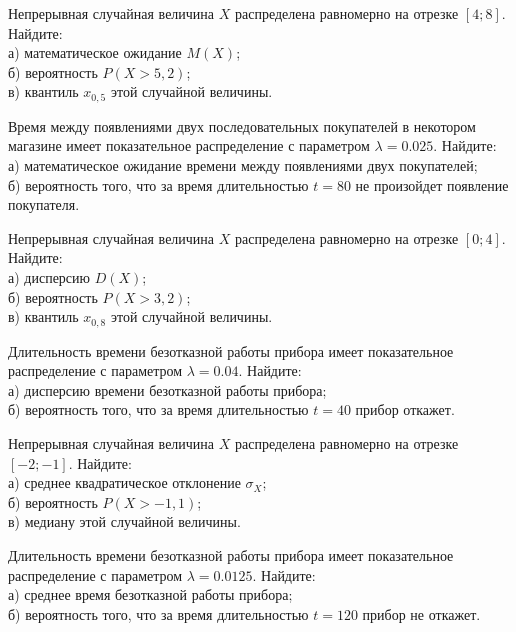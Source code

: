 \vfill

\newpage\setcounter{zad}{0}

\z Непрерывная случайная величина $X$ распределена равномерно на отрезке $[4; 8]$. Найдите: \\ \quad а) математическое ожидание $M(X)$; \\ \quad б) вероятность $P(X>5{,}2)$; \\ \quad в) квантиль $x_{0{,}5}$ этой случайной величины.


\vfill

\z Время между появлениями двух последовательных покупателей в некотором магазине имеет показательное распределение с параметром $\lambda = 0.025$. Найдите: \\ \quad а) математическое ожидание времени между появлениями двух покупателей; \\ \quad б) вероятность того, что за время длительностью $t = 80$ не произойдет появление покупателя.
 

\vfill

\newpage\setcounter{zad}{0}

\z Непрерывная случайная величина $X$ распределена равномерно на отрезке $[0; 4]$. Найдите: \\ \quad а) дисперсию $D(X)$; \\ \quad б) вероятность $P(X>3{,}2)$; \\ \quad в) квантиль $x_{0{,}8}$ этой случайной величины.


\vfill

\z Длительность времени безотказной работы прибора имеет показательное распределение с параметром $\lambda = 0.04$. Найдите: \\ \quad а) дисперсию времени безотказной работы прибора; \\ \quad б) вероятность того, что за время длительностью $t = 40$ прибор  откажет.
 

\vfill

\newpage\setcounter{zad}{0}

\z Непрерывная случайная величина $X$ распределена равномерно на отрезке $[-2; -1]$. Найдите: \\ \quad а) среднее квадратическое отклонение $\sigma_X$; \\ \quad б) вероятность $P(X>-1{,}1)$; \\ \quad в) медиану этой случайной величины.


\vfill

\z Длительность времени безотказной работы прибора имеет показательное распределение с параметром $\lambda = 0.0125$. Найдите: \\ \quad а) среднее время безотказной работы прибора; \\ \quad б) вероятность того, что за время длительностью $t = 120$ прибор не откажет.
 

\vfill

\newpage\setcounter{zad}{0}